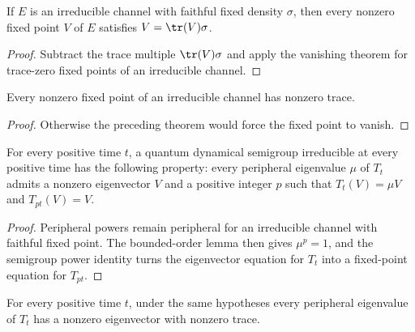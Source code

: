 \begin{theorem}
    \label{thm:fixedPoint_eq_trace_smul_irreducible_channel_ch12}
    \leanok
    If $E$ is an irreducible channel with faithful fixed density $\sigma$, then every
    nonzero fixed point $V$ of $E$ satisfies $V=\tr(V)\sigma$.
\end{theorem}

\begin{proof}
    \leanok
    Subtract the trace multiple $\tr(V)\sigma$ and apply the vanishing theorem for
    trace-zero fixed points of an irreducible channel.
\end{proof}

\begin{corollary}
    \label{cor:trace_ne_zero_fixedpoint_irreducible_channel_ch12}
    \leanok
    Every nonzero fixed point of an irreducible channel has nonzero trace.
\end{corollary}

\begin{proof}
    \leanok
    Otherwise the preceding theorem would force the fixed point to vanish.
\end{proof}

\begin{theorem}
    \label{thm:peripheral_power_fixed_eigenvector_ch12}
    \leanok
    For every positive time $t$, a quantum dynamical semigroup irreducible at every
    positive time has the following property: every peripheral eigenvalue $\mu$ of $T_t$
    admits a nonzero eigenvector $V$ and a positive integer $p$ such that
    $T_t(V)=\mu V$ and $T_{pt}(V)=V$.
\end{theorem}

\begin{proof}
    \leanok
    Peripheral powers remain peripheral for an irreducible channel with faithful fixed point.
    The bounded-order lemma then gives $\mu^p=1$, and the semigroup power identity turns the
    eigenvector equation for $T_t$ into a fixed-point equation for $T_{pt}$.
\end{proof}

\begin{theorem}
    \label{thm:peripheral_trace_ne_zero_eigenvector_ch12}
    \leanok
    For every positive time $t$, under the same hypotheses every peripheral eigenvalue
    of $T_t$ has a nonzero eigenvector with nonzero trace.
\end{theorem}

